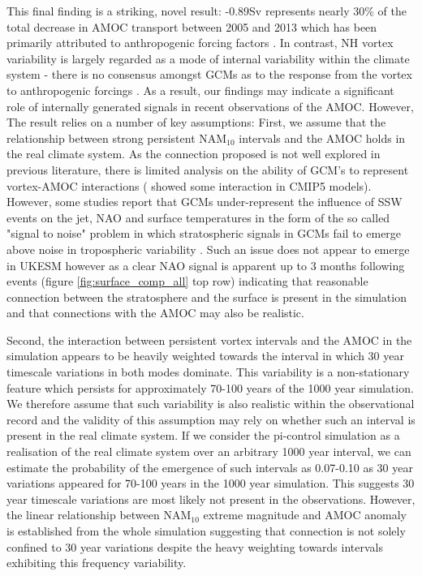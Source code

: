 This final finding is a striking, novel result: -0.89Sv represents nearly 30\% of the total decrease in AMOC transport between 2005 and 2013 which has been primarily attributed to anthropogenic forcing factors \citep{caesarObserved2018, caesarCurrent2021}. In contrast, NH vortex variability is largely regarded as a mode of internal variability within the climate system - there is no consensus amongst GCMs as to the response from the vortex to anthropogenic forcings \citep{ayarzaguenaUncertainty2020}. As a result, our findings may indicate a significant role of internally generated signals in recent observations of the AMOC. However, The result relies on a number of key assumptions: First, we assume that the relationship between strong persistent NAM$_{10}$ intervals and the AMOC holds in the real climate system. As the connection proposed is not well explored in previous literature, there is limited analysis on the ability of GCM's to represent vortex-AMOC interactions (\cite{reichlerStratospheric2012} showed some interaction in CMIP5 models). However, some studies report that GCMs under-represent the influence of SSW events on the jet, NAO and surface temperatures in the form of the so called "signal to noise" problem in which stratospheric signals in GCMs fail to emerge above noise in tropospheric variability \citep{scaifeSignaltonoise2018}. Such an issue does not appear to emerge in UKESM however as a clear NAO signal is apparent up to 3 months following events (figure \ref{fig:surface_comp_all} top row) indicating that reasonable connection between the stratosphere and the surface is present in the simulation and that connections with the AMOC may also be realistic. 

Second, the interaction between persistent vortex intervals and the AMOC in the simulation appears to be heavily weighted towards the interval in which 30 year timescale variations in both modes dominate. This variability is a non-stationary feature which persists for approximately 70-100 years of the 1000 year simulation. We therefore assume that such variability is also realistic within the observational record and the validity of this assumption may rely on whether such an interval is present in the real climate system. If we consider the pi-control simulation as a realisation of the real climate system over an arbitrary 1000 year interval, we can estimate the probability of the emergence of such intervals as 0.07-0.10 as 30 year variations appeared for 70-100 years in the 1000 year simulation. This suggests 30 year timescale variations are most likely not present in the observations. However, the linear relationship between NAM$_{10}$ extreme magnitude and AMOC anomaly is established from the whole simulation suggesting that connection is not solely confined to 30 year variations despite the heavy weighting towards intervals exhibiting this frequency variability.


